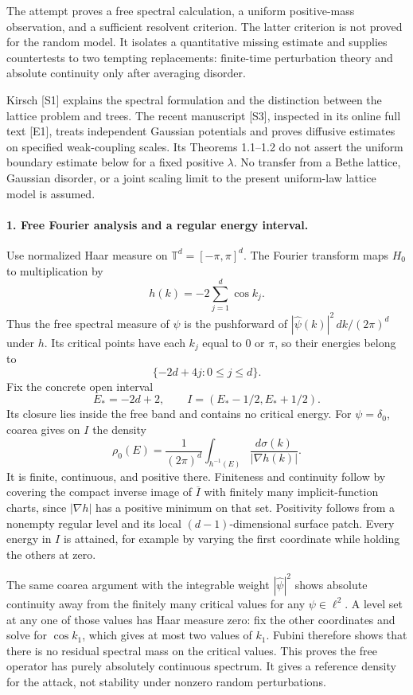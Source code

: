 \documentclass[11pt]{article}
\begin{document}
The attempt proves a free spectral calculation, a uniform positive-mass
observation, and a sufficient resolvent criterion. The latter criterion is
not proved for the random model. It isolates a quantitative missing estimate
and supplies countertests to two tempting replacements: finite-time
perturbation theory and absolute continuity only after averaging disorder.

Kirsch [S1] explains the spectral formulation and the distinction between
the lattice problem and trees. The recent manuscript [S3], inspected in its
online full text [E1], treats independent Gaussian potentials and proves
diffusive estimates on specified weak-coupling scales. Its Theorems 1.1--1.2
do not assert the uniform boundary estimate below for a fixed positive
$\lambda$. No transfer from a Bethe lattice, Gaussian disorder, or a joint
scaling limit to the present uniform-law lattice model is assumed.

\paragraph{1. Free Fourier analysis and a regular energy interval.}
Use normalized Haar measure on $\mathbb T^d=[-\pi,\pi]^d$. The Fourier
transform maps $H_0$ to multiplication by
\[
 h(k)=-2\sum_{j=1}^d\cos k_j.
 \tag{31.1}
\]
Thus the free spectral measure of $\psi$ is the pushforward of
$|\widehat\psi(k)|^2\,dk/(2\pi)^d$ under $h$. Its critical points have
each $k_j$ equal to $0$ or $\pi$, so their energies belong to
\[
 \{-2d+4j:0\leq j\leq d\}.
\]
Fix the concrete open interval
\[
 E_*=-2d+2,\qquad I=(E_*-1/2,E_*+1/2).
 \tag{31.2}
\]
Its closure lies inside the free band and contains no critical energy.
For $\psi=\delta_0$, coarea gives on $I$ the density
\[
 \rho_0(E)=\frac{1}{(2\pi)^d}
     \int_{h^{-1}(E)}\frac{d\sigma(k)}{|\nabla h(k)|}.
 \tag{31.3}
\]
It is finite, continuous, and positive there. Finiteness and continuity
follow by covering the compact inverse image of $\overline I$ with finitely
many implicit-function charts, since $|\nabla h|$ has a positive minimum
on that set. Positivity follows from a nonempty regular level and its local
$(d-1)$-dimensional surface patch. Every energy in $I$ is attained, for
example by varying the first coordinate while holding the others at zero.

The same coarea argument with the integrable weight
$|\widehat\psi|^2$ shows absolute continuity away from the finitely many
critical values for any $\psi\in\ell^2$. A level set at any one of those
values has Haar measure zero: fix the other coordinates and solve for
$\cos k_1$, which gives at most two values of $k_1$. Fubini therefore shows
that there is no residual spectral mass on the critical values. This proves
the free operator has purely absolutely continuous spectrum. It gives a
reference density for the attack, not stability under nonzero random
perturbations.
\end{document}
